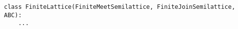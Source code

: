 \begin{verbatim}
class FiniteLattice(FiniteMeetSemilattice, FiniteJoinSemilattice, ABC):
    ...
\end{verbatim}